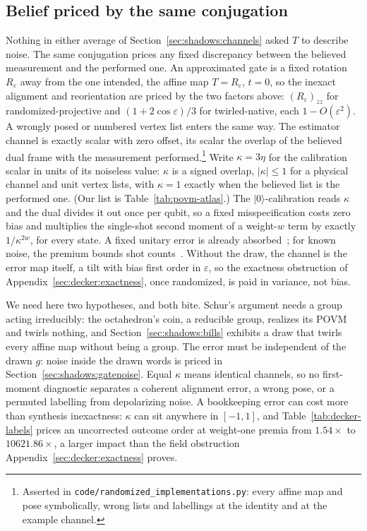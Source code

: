\documentclass[11pt, oneside, openany]{scrbook}
\newcommand{\ket}[1]{|#1\rangle}
\begin{document}
\subsection{Belief priced by the same conjugation} \label{sec:shadows:belief}

Nothing in either average of Section~\ref{sec:shadows:channels} asked $T$ to describe noise. The same conjugation prices any fixed discrepancy between the believed measurement and the performed one. An approximated gate is a fixed rotation $R_\varepsilon$ away from the one intended, the affine map $T = R_\varepsilon$, $t = 0$, so the inexact alignment and reorientation are priced by the two factors above: $(R_\varepsilon)_{zz}$ for randomized-projective and $(1 + 2\cos\varepsilon)/3$ for twirled-native, each $1 - O(\varepsilon^2)$. A wrongly posed or numbered vertex list enters the same way. The estimator channel is exactly scalar with zero offset, its scalar the overlap of the believed dual frame with the measurement performed.\footnote{Asserted in \texttt{code/randomized\_implementations.py}: every affine map and pose symbolically, wrong lists and labellings at the identity and at the example channel.} Write $\kappa = 3\eta$ for the calibration scalar in units of its noiseless value: $\kappa$ is a signed overlap, $|\kappa| \le 1$ for a physical channel and unit vertex lists, with $\kappa = 1$ exactly when the believed list is the performed one. (Our list is Table~\ref{tab:povm-atlas}.) The $\ket{0}$-calibration reads $\kappa$ and the dual divides it out once per qubit, so a fixed misspecification costs zero bias and multiplies the single-shot second moment of a weight-$w$ term by exactly $1/\kappa^{2w}$, for every state. A fixed unitary error is already absorbed~\cite[Thm.~3]{chen2021robustshadowestimationa}; for known noise, the premium bounds shot counts~\cite[Cor.~5.5]{koh2022classicalshadowsnoisea}. Without the draw, the channel is the error map itself, a tilt with bias first order in $\varepsilon$, so the exactness obstruction of Appendix~\ref{sec:decker:exactness}, once randomized, is paid in variance, not bias.

We need here two hypotheses, and both bite. Schur's argument needs a group acting irreducibly: the octahedron's coin, a reducible group, realizes its POVM and twirls nothing, and Section~\ref{sec:shadows:bills} exhibits a draw that twirls every affine map without being a group. The error must be independent of the drawn $g$: noise inside the drawn words is priced in Section~\ref{sec:shadows:gatenoise}. Equal $\kappa$ means identical channels, so no first-moment diagnostic separates a coherent alignment error, a wrong pose, or a permuted labelling from depolarizing noise. A bookkeeping error can cost more than synthesis inexactness: $\kappa$ can sit anywhere in $[-1, 1]$, and Table~\ref{tab:decker-labels} prices an uncorrected outcome order at weight-one premia from $1.54\times$ to $10621.86\times$, a larger impact than the field obstruction Appendix~\ref{sec:decker:exactness} proves.
\end{document}
